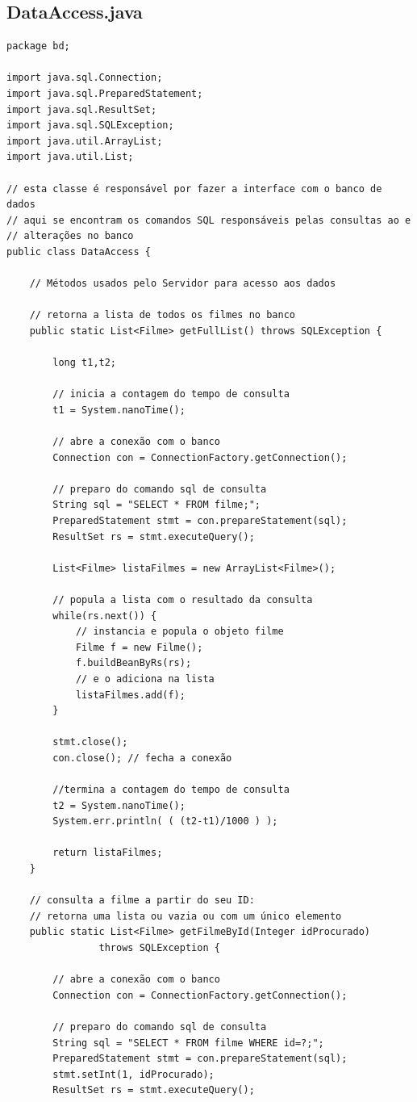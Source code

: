 \documentclass[11pt,twoside]{article}
\begin{document}
\subsection{DataAccess.java}       %
\begin{verbatim}
package bd;

import java.sql.Connection;
import java.sql.PreparedStatement;
import java.sql.ResultSet;
import java.sql.SQLException;
import java.util.ArrayList;
import java.util.List;

// esta classe é responsável por fazer a interface com o banco de dados
// aqui se encontram os comandos SQL responsáveis pelas consultas ao e 
// alterações no banco
public class DataAccess {

	// Métodos usados pelo Servidor para acesso aos dados	
	
	// retorna a lista de todos os filmes no banco
	public static List<Filme> getFullList() throws SQLException {
		
		long t1,t2;
		
		// inicia a contagem do tempo de consulta
    	t1 = System.nanoTime();
    	
		// abre a conexão com o banco
		Connection con = ConnectionFactory.getConnection();

		// preparo do comando sql de consulta
		String sql = "SELECT * FROM filme;";
		PreparedStatement stmt = con.prepareStatement(sql);
		ResultSet rs = stmt.executeQuery();

		List<Filme> listaFilmes = new ArrayList<Filme>();

		// popula a lista com o resultado da consulta
		while(rs.next()) {
			// instancia e popula o objeto filme
			Filme f = new Filme();
			f.buildBeanByRs(rs);
			// e o adiciona na lista
			listaFilmes.add(f);
		}

		stmt.close();
		con.close(); // fecha a conexão
		
		//termina a contagem do tempo de consulta
		t2 = System.nanoTime();
		System.err.println( ( (t2-t1)/1000 ) );
		
		return listaFilmes;
	}

	// consulta a filme a partir do seu ID:
	// retorna uma lista ou vazia ou com um único elemento
	public static List<Filme> getFilmeById(Integer idProcurado) 
                throws SQLException {

		// abre a conexão com o banco
		Connection con = ConnectionFactory.getConnection();
		
		// preparo do comando sql de consulta
		String sql = "SELECT * FROM filme WHERE id=?;";
		PreparedStatement stmt = con.prepareStatement(sql);
		stmt.setInt(1, idProcurado);
		ResultSet rs = stmt.executeQuery();


\end{verbatim}
\end{document}
